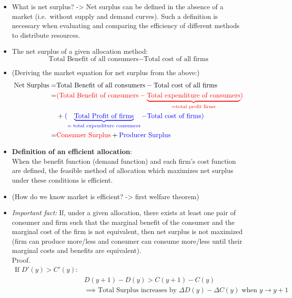 \documentclass[
]{ltjarticle}
\begin{document}
\begin{itemize}
\item
  What is net surplus? -\textgreater{} Net surplus can be defined in the
  absence of a market (i.e.~without supply and demand curves). Such a
  definition is necessary when evaluating and comparing the efficiency
  of different methods to distribute resources.
\item
  The net surplus of a given allocation method:
  \[\text{Total Benefit of all consumers} - \text{Total cost of all firms}\]
\item
  (Deriving the market equation for net surplus from the above:)
  \[\begin{aligned} 
  \text{Net Surplus} =& \text{Total Benefit of all consumers} - \text{Total cost of all firms} \\
  =& \textcolor{red}{(\text{Total Benefit of consumers} - \underbrace{\text{Total expenditure of consumers}}_\text{=total profit firms})}\\
  &+ \textcolor{blue}{(\underbrace{\text{Total Profit of firms}}_\text{= total expenditure consumers} - \text{Total cost of firms})} \\
  =& \textcolor{red}{\text{Consumer Surplus}} + \textcolor{blue}{\text{Producer Surplus}}
  \end{aligned}\]
\item
  \textbf{Definition of an efficient allocation}:\\
  When the benefit function (demand function) and each firm's cost
  function are defined, the feasible method of allocation which
  maximizes net surplus under these conditions is efficient.
\item
  (How do we know market is efficient? -\textgreater{} first welfare
  theorem)
\item
  \emph{Important fact:} If, under a given allocation, there exists at
  least one pair of consumer and firm such that the marginal benefit of
  the consumer and the marginal cost of the firm is not equivalent, then
  net surplus is not maximized (firm can produce more/less and consumer
  can consume more/less until their marginal costs and benefits are
  equivalent).\\
  Proof. \[\begin{aligned} 
  \text{If } D'(y) > C'(y):& \\
  & D(y+1) - D(y) > C(y+1) - C(y) \\
  &\implies \text{Total Surplus increases by } \Delta D(y) - \Delta C(y) \text{ when } y \to y + 1\\

\end{aligned}\]
\end{itemize}
\end{document}
